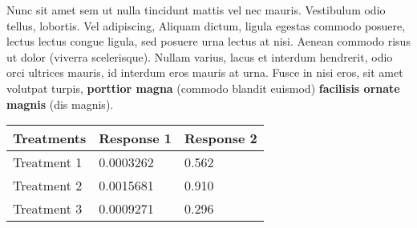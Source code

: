 Nunc sit amet sem ut nulla tincidunt mattis vel nec mauris. Vestibulum odio 
tellus, lobortis. Vel adipiscing, Aliquam dictum, ligula egestas commodo posuere, 
lectus lectus congue ligula, sed posuere urna lectus at nisi. Aenean commodo risus 
ut dolor (viverra scelerisque). Nullam varius, lacus et interdum hendrerit, odio 
orci ultrices mauris, id interdum eros mauris at urna. Fusce in nisi eros, sit 
amet volutpat turpis, \textbf{porttior magna} (commodo blandit euismod) 
\textbf{facilisis ornate magnis} (dis magnis). 

\begin{center}
\begin{tabular}{l l l}
\toprule
\textbf{Treatments} & \textbf{Response 1} & \textbf{Response 2}\\
\midrule
Treatment 1 & 0.0003262 & 0.562 \\
Treatment 2 & 0.0015681 & 0.910 \\
Treatment 3 & 0.0009271 & 0.296 \\
\bottomrule
\end{tabular}
\end{center}
